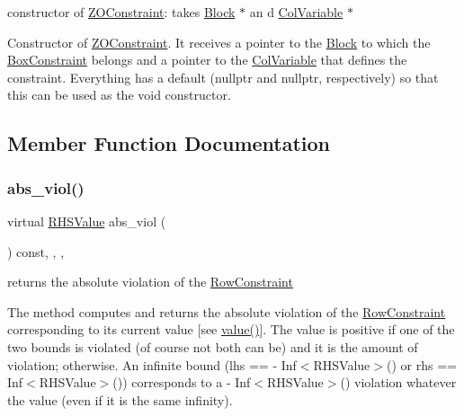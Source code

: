constructor of \mbox{\hyperlink{class_s_m_spp__di__unipi__it_1_1_z_o_constraint}{Z\+O\+Constraint}}\+: takes \mbox{\hyperlink{class_s_m_spp__di__unipi__it_1_1_block}{Block}} $\ast$ an d \mbox{\hyperlink{class_s_m_spp__di__unipi__it_1_1_col_variable}{Col\+Variable}} $\ast$ 

Constructor of \mbox{\hyperlink{class_s_m_spp__di__unipi__it_1_1_z_o_constraint}{Z\+O\+Constraint}}. It receives a pointer to the \mbox{\hyperlink{class_s_m_spp__di__unipi__it_1_1_block}{Block}} to which the \mbox{\hyperlink{class_s_m_spp__di__unipi__it_1_1_box_constraint}{Box\+Constraint}} belongs and a pointer to the \mbox{\hyperlink{class_s_m_spp__di__unipi__it_1_1_col_variable}{Col\+Variable}} that defines the constraint. Everything has a default (nullptr and nullptr, respectively) so that this can be used as the void constructor. 

\subsection{Member Function Documentation}
\mbox{\label{class_s_m_spp__di__unipi__it_1_1_z_o_constraint_a1e06e555eab5078e4d5ec16745778984}} 
\subsubsection{\texorpdfstring{abs\+\_\+viol()}{abs\_viol()}}
{\footnotesize\ttfamily virtual \mbox{\hyperlink{class_s_m_spp__di__unipi__it_1_1_row_constraint_a8813536ab3b13a81c8e83a999ade3bd8}{R\+H\+S\+Value}} abs\+\_\+viol (\begin{DoxyParamCaption}\item[{void}]{ }\end{DoxyParamCaption}) const\hspace{0.3cm}{\ttfamily [inline]}, {\ttfamily [final]}, {\ttfamily [override]}, {\ttfamily [virtual]}}



returns the absolute violation of the \mbox{\hyperlink{class_s_m_spp__di__unipi__it_1_1_row_constraint}{Row\+Constraint}} 

The method computes and returns the absolute violation of the \mbox{\hyperlink{class_s_m_spp__di__unipi__it_1_1_row_constraint}{Row\+Constraint}} corresponding to its current value \mbox{[}see \mbox{\hyperlink{class_s_m_spp__di__unipi__it_1_1_one_var_constraint_ad9256be16b98f3b557f54fa5e2118db7}{value()}}\mbox{]}. The value is positive if one of the two bounds is violated (of course not both can be) and it is the amount of violation; otherwise. An infinite bound (lhs == -\/ Inf$<$\+R\+H\+S\+Value$>$() or rhs == Inf$<$\+R\+H\+S\+Value$>$()) corresponds to a -\/ Inf$<$\+R\+H\+S\+Value$>$() violation whatever the value (even if it is the same infinity).

